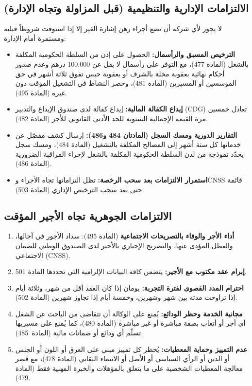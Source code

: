 \subsection{الالتزامات الإدارية والتنظيمية (قبل المزاولة وتجاه الإدارة)}
لا يجوز لأي شركة أن تضع أجراء رهن إشارة الغير إلا إذا استوفت شروطاً قبلية ومستمرة أمام الإدارة:
\begin{itemize}[leftmargin=*, itemsep=5pt]
    \item \textbf{الترخيص المسبق والرأسمال:} الحصول على إذن من السلطة الحكومية المكلفة بالشغل (المادة \textenglish{477})، مع التوفر على رأسمال لا يقل عن \textenglish{100.000} درهم وعدم صدور أحكام نهائية بعقوبة مخلة بالشرف أو بعقوبة حبس تفوق ثلاثة أشهر في حق المؤسسين أو المسيرين (المادة \textenglish{481})، وحصر النشاط في التشغيل المؤقت دون غيره (المادة \textenglish{495}).
    \item \textbf{إيداع الكفالة المالية:} إيداع كفالة لدى صندوق الإيداع والتدبير (\textenglish{CDG}) تعادل خمسين مرة القيمة الإجمالية السنوية للحد الأدنى القانوني للأجر (المادة \textenglish{482}).
    \item \textbf{التقارير الدورية ومسك السجل (المادتان \textenglish{484} و\textenglish{486}):} إرسال كشف مفصّل عن خدماتها كل ستة أشهر إلى المصالح المكلفة بالتشغيل (المادة \textenglish{484})، ومسك سجل يحدّد نموذجه من لدن السلطة الحكومية المكلفة بالشغل لإجراء المراقبة الضرورية (المادة \textenglish{486}).
    \item \textbf{استمرار الالتزامات بعد سحب الرخصة:} تظل التزاماتها تجاه الأجراء و\textenglish{CNSS} قائمة حتى بعد سحب الترخيص الإداري (المادة \textenglish{503}).
\end{itemize}

\subsection{الالتزامات الجوهرية تجاه الأجير المؤقت}
\begin{enumerate}[leftmargin=*, itemsep=5pt]
    \item \textbf{أداء الأجر والوفاء بالتصريحات الاجتماعية} (المادة \textenglish{495}): سداد الأجور في آجالها، والعطل المؤدى عنها، والتصريح الإجباري بالأجير لدى الصندوق الوطني للضمان الاجتماعي (\textfrench{CNSS}).
    \item \textbf{إبرام عقد مكتوب مع الأجير:} يتضمن كافة البيانات الإلزامية التي تحددها المادة \textenglish{501}.
    \item \textbf{احترام المدد القصوى لفترة التجربة:} يومان إذا كان العقد أقل من شهر، وثلاثة أيام إذا تراوحت مدته بين شهر وشهرين، وخمسة أيام إذا تجاوز شهرين (المادة \textenglish{502}).
    \item \textbf{مجانية الخدمة وحظر الودائع:} يُمنع على الوكالة أن تتقاضى من الباحث عن الشغل أي أجر أو أتعاب بصفة مباشرة أو غير مباشرة (المادة \textenglish{480})، كما يُمنع على مسيريها تسلّم أي ودائع أو ضمانات مالية (المادة~\textenglish{485}).
    \item \textbf{عدم التمييز وحماية المعطيات:} يُحظر كل تمييز مبني على العرق أو اللون أو الجنس أو الدين أو الرأي السياسي أو الأصل أو الانتماء النقابي (المادة \textenglish{478})، مع قصر معالجة المعطيات الشخصية على ما يتعلق بالمؤهلات والخبرة المهنية فقط (المادة \textenglish{479}).
\end{enumerate}

